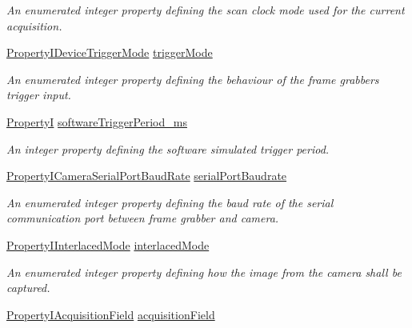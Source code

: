 \begin{DoxyCompactItemize}
\begin{DoxyCompactList}\small\item\em An enumerated integer property defining the scan clock mode used for the current acquisition. \end{DoxyCompactList}\item 
\hyperlink{group___device_specific_interface_gaac7cb59349519ed98d73b8605c3dec64}{Property\+I\+Device\+Trigger\+Mode} \hyperlink{classmv_i_m_p_a_c_t_1_1acquire_1_1_camera_settings_frame_grabber_a6bb960b80203a48a68ac20917ebd5e3f}{trigger\+Mode}
\begin{DoxyCompactList}\small\item\em An enumerated integer property defining the behaviour of the frame grabbers trigger input. \end{DoxyCompactList}\item 
\hyperlink{group___common_interface_ga12d5e434238ca242a1ba4c6c3ea45780}{Property\+I} \hyperlink{classmv_i_m_p_a_c_t_1_1acquire_1_1_camera_settings_frame_grabber_a91d1b7187120dee62c0daf60ec53dc41}{software\+Trigger\+Period\+\_\+ms}
\begin{DoxyCompactList}\small\item\em An integer property defining the software simulated trigger period. \end{DoxyCompactList}\item 
\hyperlink{group___device_specific_interface_ga74bf9929c27fa7d47798e130fa005e6a}{Property\+I\+Camera\+Serial\+Port\+Baud\+Rate} \hyperlink{classmv_i_m_p_a_c_t_1_1acquire_1_1_camera_settings_frame_grabber_afb3db5d1fec3c662154b4f57c03c58c2}{serial\+Port\+Baudrate}
\begin{DoxyCompactList}\small\item\em An enumerated integer property defining the baud rate of the serial communication port between frame grabber and camera. \end{DoxyCompactList}\item 
\hyperlink{group___device_specific_interface_gad01158960a8635ab8a2bd3199056045c}{Property\+I\+Interlaced\+Mode} \hyperlink{classmv_i_m_p_a_c_t_1_1acquire_1_1_camera_settings_frame_grabber_a9ef986a0f1d1e13dec2f29c13bd4de5c}{interlaced\+Mode}
\begin{DoxyCompactList}\small\item\em An enumerated integer property defining how the image from the camera shall be captured. \end{DoxyCompactList}\item 
\hyperlink{group___device_specific_interface_ga01090436ef6969d1fedb45ce24f68d9b}{Property\+I\+Acquisition\+Field} \hyperlink{classmv_i_m_p_a_c_t_1_1acquire_1_1_camera_settings_frame_grabber_ad60c4e0bf3ad80348a10061140dcb57c}{acquisition\+Field}

\end{DoxyCompactItemize}
